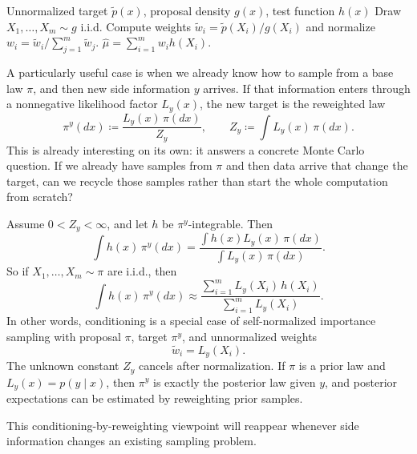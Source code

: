 \begin{algorithm}[t]
  \caption{Self-normalized importance sampling}
  \label{alg:importance-sampling}
  \begin{algorithmic}[1]
    \Require Unnormalized target $\tilde p(x)$, proposal density $g(x)$, test function $h(x)$
    \State Draw $X_1,\dots,X_m \sim g$ i.i.d.
    \State Compute weights $\tilde w_i = \tilde p(X_i)/g(X_i)$ and normalize
    $w_i = \tilde w_i / \sum_{j=1}^m \tilde w_j$.
    \State \Return $\hat\mu = \sum_{i=1}^m w_i h(X_i)$.
\end{algorithmic}
\end{algorithm}

A particularly useful case is when we already know how to sample from a base law \(\pi\), and then new side information \(y\) arrives.
If that information enters through a nonnegative likelihood factor \(L_y(x)\), the new target is the reweighted law
\[
  \pi^y(dx)
  \coloneqq
  \frac{L_y(x)\,\pi(dx)}{Z_y},
  \qquad
  Z_y\coloneqq \int L_y(x)\,\pi(dx).
\]
This is already interesting on its own:
it answers a concrete Monte Carlo question.
If we already have samples from \(\pi\) and then data arrive that change the target, can we recycle those samples rather than start the whole computation from scratch?

\begin{example}
\label{ex:conditioning-likelihood-reweighting}
Assume \(0<Z_y<\infty\), and let \(h\) be \(\pi^y\)-integrable.
Then
\begin{equation}
  \int h(x)\,\pi^y(dx)
  =
  \frac{\int h(x)L_y(x)\,\pi(dx)}{\int L_y(x)\,\pi(dx)}.
  \label{eq:conditioning-likelihood-reweighting}
\end{equation}
So if \(X_1,\dots,X_m\sim\pi\) are i.i.d., then
\[
  \int h(x)\,\pi^y(dx)
  \approx
  \frac{\sum_{i=1}^m L_y(X_i)\,h(X_i)}{\sum_{i=1}^m L_y(X_i)}.
\]
In other words, conditioning is a special case of self-normalized importance sampling with proposal \(\pi\), target \(\pi^y\), and unnormalized weights
\[
  \tilde w_i=L_y(X_i).
\]
The unknown constant \(Z_y\) cancels after normalization.
If \(\pi\) is a prior law and \(L_y(x)=p(y\mid x)\), then \(\pi^y\) is exactly the posterior law given \(y\), and posterior expectations can be estimated by reweighting prior samples.
\end{example}

This conditioning-by-reweighting viewpoint will reappear whenever side information changes an existing sampling problem.


